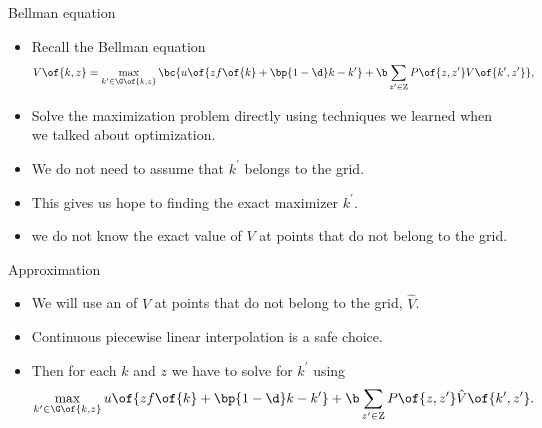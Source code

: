 \documentclass[11pt,xcolor={dvipsnames},aspectratio=159,hyperref={pdftex,pdfpagemode=UseNone,hidelinks,pdfdisplaydoctitle=true},usepdftitle=false]{beamer}
\begin{document}
        \begin{frame}
            \end{frame}

    \begin{frame}{Bellman equation}   
        \begin{itemize}
            \item Recall the Bellman equation  
            \begin{align*}
                V\of{k,z} = \max_{k^\prime \in \G\of{k,z}} \bc{u\of{z f\of{k} + \bp{1-\d}k - k^\prime} + \b \sum_{z^\prime \in \text{Z}} P\of{z,z^\prime} V\of{k^\prime,z^\prime} },
            \end{align*}
            \item Solve the maximization problem directly using techniques we learned when we talked about optimization.
            \item We do not need to assume that $k^\prime$ belongs to the grid. 
            \item This gives us hope to finding the exact maximizer $k^\prime$.
            \item {} we do not know the exact value of $V$ at points that do not belong to the grid.
            
        \end{itemize}
        \end{frame}  

    \begin{frame}{Approximation}   
        \begin{itemize}
            \item We will use an  of $V$ at points that do not belong to the grid, $\hat{V}$. 
            \item Continuous piecewise linear interpolation is a safe choice.
            \item Then for each $k$ and $z$ we have to solve for $k^\prime$ using \begin{align*}
                \max_{k^\prime \in \G\of{k,z}} u\of{z f\of{k} + \bp{1-\d}k - k^\prime} + \b \sum_{z^\prime \in \text{Z}} P\of{z,z^\prime} \hat{V}\of{k^\prime,z^\prime} .
            \end{align*}
        \end{itemize}
        \end{frame}  
\end{document}
